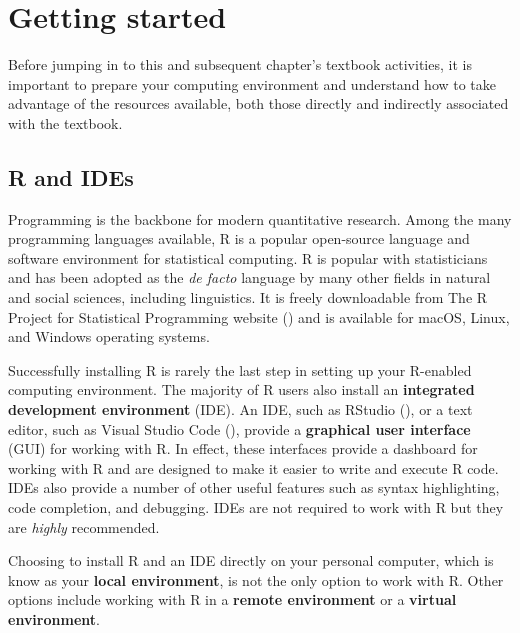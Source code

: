 \documentclass[
  letterpaper,
]{latex/krantz}
\theoremstyle{definition}
\theoremstyle{remark}
\begin{document}
\section*{Getting started}\label{sec-preface-getting-started}


Before jumping in to this and subsequent chapter's textbook activities,
it is important to prepare your computing environment and understand how
to take advantage of the resources available, both those directly and
indirectly associated with the textbook.

\subsection*{R and IDEs}\label{sec-preface-r-ides}

Programming is the backbone for modern quantitative research. Among the
many programming languages available, R is a popular open-source
language and software environment for statistical computing. R is
popular with statisticians and has been adopted as the \emph{de facto}
language by many other fields in natural and social sciences, including
linguistics. It is freely downloadable from The R Project for
Statistical Programming website () and is available for macOS, Linux, and Windows
operating systems.

Successfully installing R is rarely the last step in setting up your
R-enabled computing environment. The majority of R users also install an
\textbf{integrated development environment} (IDE). An IDE, such as
RStudio (), or a text editor, such
as Visual Studio Code (),
provide a \textbf{graphical user interface} (GUI) for working with R. In
effect, these interfaces provide a dashboard for working with R and are
designed to make it easier to write and execute R code. IDEs also
provide a number of other useful features such as syntax highlighting,
code completion, and debugging. IDEs are not required to work with R but
they are \emph{highly} recommended.

Choosing to install R and an IDE directly on your personal computer,
which is know as your \textbf{local environment}, is not the only option
to work with R. Other options include working with R in a \textbf{remote
environment} or a \textbf{virtual environment}.
\end{document}
